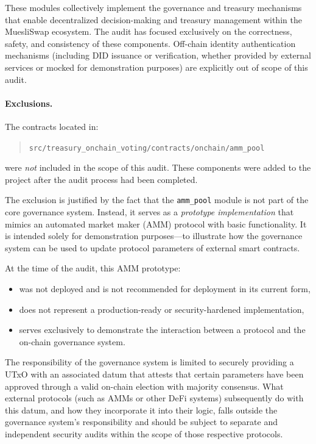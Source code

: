 \documentclass[11pt]{article}
\begin{document}
These modules collectively implement the governance and treasury mechanisms that enable decentralized decision-making and treasury management within the MuesliSwap ecosystem. The audit has focused exclusively on the correctness, safety, and consistency of these components. Off-chain identity authentication mechanisms (including DID issuance or verification, whether provided by external services or mocked for demonstration purposes) are explicitly out of scope of this audit.

\paragraph{Exclusions.}
The contracts located in:
\begin{quote}
\texttt{src/treasury\_onchain\_voting/contracts/onchain/amm\_pool}
\end{quote}
were \emph{not} included in the scope of this audit. These components were added to the project after the audit process had been completed.

The exclusion is justified by the fact that the \texttt{amm\_pool} module is not part of the core governance system. Instead, it serves as a \emph{prototype implementation} that mimics an automated market maker (AMM) protocol with basic functionality. It is intended solely for demonstration purposes—to illustrate how the governance system can be used to update protocol parameters of external smart contracts.

At the time of the audit, this AMM prototype:
\begin{itemize}
    \item was not deployed and is not recommended for deployment in its current form,
    \item does not represent a production-ready or security-hardened implementation,
    \item serves exclusively to demonstrate the interaction between a protocol and the on-chain governance system.
\end{itemize}

The responsibility of the governance system is limited to securely providing a UTxO with an associated datum that attests that certain parameters have been approved through a valid on-chain election with majority consensus. What external protocols (such as AMMs or other DeFi systems) subsequently do with this datum, and how they incorporate it into their logic, falls outside the governance system’s responsibility and should be subject to separate and independent security audits within the scope of those respective protocols.
\end{document}
